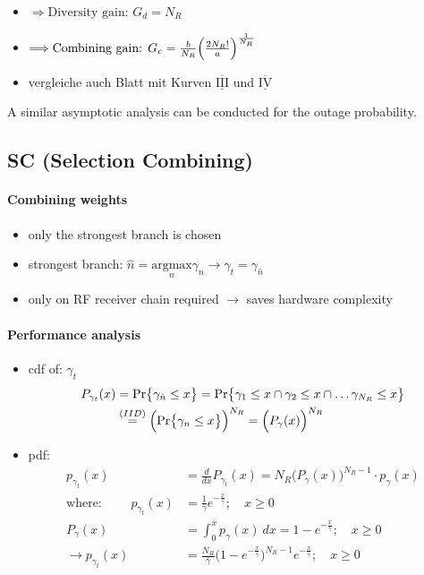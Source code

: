 \documentclass[a4paper, 10pt]{article}
\newcommand{\rom}[1]{$\underline{\overline{\text{#1}}}$}
\begin{document}
\begin{itemize}
\begin{itemize}
		\item[] $\Longrightarrow \text{Diversity gain: } G_d = N_R$
		\item[] $\Longrightarrow \text{Combining gain: } G_c = \frac{b}{N_R}\Bigl( \frac{2N_R!}{a}\Bigr)^{\frac{1}{N_R}}$
		\item[] vergleiche auch Blatt mit Kurven \rom{III} und \rom{IV}
	\end{itemize}
\end{itemize}
A similar asymptotic analysis can be conducted for the outage probability.
\subsection{SC (Selection Combining)}
\paragraph*{Combining weights}
	\begin{itemize}
		\item only the strongest branch is chosen
		\item strongest branch: $\hat{n} = \underset{n}{\text{argmax}} \gamma _n \longrightarrow \gamma _t = \gamma _{\hat{n}}$
		\item only on RF receiver chain required $\rightarrow$\; saves hardware complexity 
	\end{itemize}
\paragraph*{Performance analysis}
	\begin{itemize}
		\item cdf of: $\gamma _t$
			\begin{align*}
				P_{\gamma _t}(x) &= \text{Pr}\bigl\{\gamma _{\hat{n}} \leq x\bigr\} = \text{Pr}\bigl\{\gamma _1 \leq x \cap \gamma _2 \leq x \cap \dots \gamma _{N_R} \leq x\bigr\}\\
				&\overset{(IID)}{=} \Bigl(\text{Pr}\bigl\{\gamma _n \leq x\bigr\}\Bigr)^{N_R} = \Bigl( P_{\gamma}(x)\Bigr)^{N_R}
			\end{align*}
		\item pdf:
			\begin{align*}
				p_{\gamma _t}(x) &= \frac{d}{dx}P_{\gamma _t}(x) = N_R\bigl(P_{\gamma}(x)\bigr)^{N_R-1}\cdot p_{\gamma}(x)\\
				\text{where: }\qquad p_{\gamma _t}(x) &= \frac{1}{\bar{\gamma}}e^{-\frac{x}{\bar{\gamma}}};\quad x\geq 0\\
				P_{\gamma}(x) &= \int_{0}^{x}p_{\gamma}(x)~dx = 1 - e^{-\frac{x}{\bar{\gamma}}};\quad x\geq 0\\
				\rightarrow p_{\gamma _t}(x) &= \frac{N_R}{\bar{\gamma}}\bigl( 1 - e^{-\frac{x}{\bar{\gamma}}}\bigr)^{N_R-1}e^{-\frac{x}{\bar{\gamma}}};\quad x\geq 0
			\end{align*}
	\end{itemize}
\end{document}
